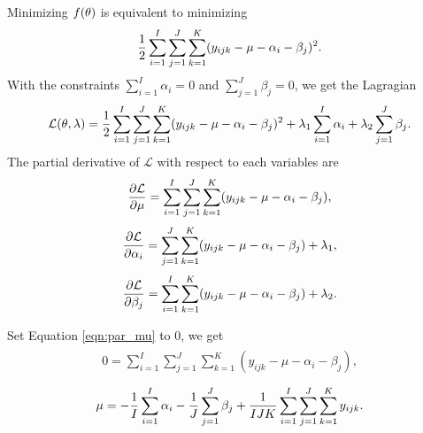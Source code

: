 \documentclass{scrartcl}
\begin{document}
Minimizing $f(\mathbf{\theta})$ is equivalent to minimizing
\begin{equation}
{1 \over 2} \sum_{i=1}^I \sum_{j=1}^J \sum_{k=1}^K (y_{ijk}-\mu-\alpha_i-\beta_j)^2 .
\end{equation}
With the constraints $\sum_{i=1}^I\alpha_i=0$ and $\sum_{j=1}^J\beta_j=0$,
we get the Lagragian 
\begin{equation}
\mathcal{L}(\mathbf{\theta}, \mathbf{\lambda})=
{1 \over 2} \sum_{i=1}^I \sum_{j=1}^J \sum_{k=1}^K (y_{ijk}-\mu-\alpha_i-\beta_j)^2
+ \lambda_1 \sum_{i=1}^I \alpha_i + \lambda_2 \sum_{j=1}^J \beta_j .
\end{equation}
The partial derivative of $\mathcal{L}$ with respect to each variables are
\begin{equation}
{\partial \mathcal{L} \over \partial \mu} =
\sum_{i=1}^I \sum_{j=1}^J \sum_{k=1}^K (y_{ijk}-\mu-\alpha_i-\beta_j) ,
\label{eqn:par_mu}
\end{equation}
\begin{equation}
{\partial \mathcal{L} \over \partial \alpha_i} =
\sum_{j=1}^J \sum_{k=1}^K (y_{ijk}-\mu-\alpha_i-\beta_j)+\lambda_1 ,
\label{eqn:par_alpha}
\end{equation}
\begin{equation}
{\partial \mathcal{L} \over \partial \beta_j} =
\sum_{i=1}^I \sum_{k=1}^K (y_{ijk}-\mu-\alpha_i-\beta_j)+\lambda_2 .
\label{eqn:par_beta}
\end{equation}

Set Equation \eqref{eqn:par_mu} to 0, we get
\begin{align}
\begin{split}
0 = \sum_{i=1}^I \sum_{j=1}^J \sum_{k=1}^K (y_{ijk}-\mu-\alpha_i-\beta_j) ,
\end{split}
\end{align}
\begin{equation}
\mu = -{1 \over I} \sum_{i=1}^I \alpha_i - {1 \over J} \sum_{j=1}^J \beta_j
+ {1 \over IJK} \sum_{i=1}^I \sum_{j=1}^J \sum_{k=1}^K y_{ijk} .
\end{equation}
\end{document}
